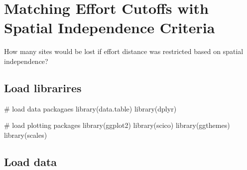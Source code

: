 \documentclass[]{article}
\newenvironment{Shaded}{}{}
\newcommand{\CommentTok}[1]{\textcolor[rgb]{0.00,0.50,0.00}{#1}}
\newcommand{\DataTypeTok}[1]{#1}
\newcommand{\DecValTok}[1]{#1}
\newcommand{\ErrorTok}[1]{\textcolor[rgb]{1.00,0.00,0.00}{\textbf{#1}}}
\newcommand{\FloatTok}[1]{#1}
\newcommand{\KeywordTok}[1]{\textcolor[rgb]{0.00,0.00,1.00}{#1}}
\newcommand{\NormalTok}[1]{#1}
\newcommand{\OperatorTok}[1]{#1}
\newcommand{\OtherTok}[1]{\textcolor[rgb]{1.00,0.25,0.00}{#1}}
\newcommand{\StringTok}[1]{\textcolor[rgb]{0.00,0.50,0.50}{#1}}
\begin{document}
\hypertarget{matching-effort-cutoffs-with-spatial-independence-criteria}{%
\section{Matching Effort Cutoffs with Spatial Independence Criteria}\label{matching-effort-cutoffs-with-spatial-independence-criteria}}

How many sites would be lost if effort distance was restricted based on spatial independence?

\hypertarget{load-librarires}{%
\subsection{Load librarires}\label{load-librarires}}

\begin{Shaded}
\begin{Highlighting}[numbers=left,,]
\CommentTok{# load data packagaes}
\KeywordTok{library}\NormalTok{(data.table)}
\KeywordTok{library}\NormalTok{(dplyr)}

\CommentTok{# load plotting packages}
\KeywordTok{library}\NormalTok{(ggplot2)}
\KeywordTok{library}\NormalTok{(scico)}
\KeywordTok{library}\NormalTok{(ggthemes)}
\KeywordTok{library}\NormalTok{(scales)}
\end{Highlighting}
\end{Shaded}

\hypertarget{load-data}{%
\subsection{Load data}\label{load-data}}

\begin{Shaded}
\end{Shaded}
\end{document}
